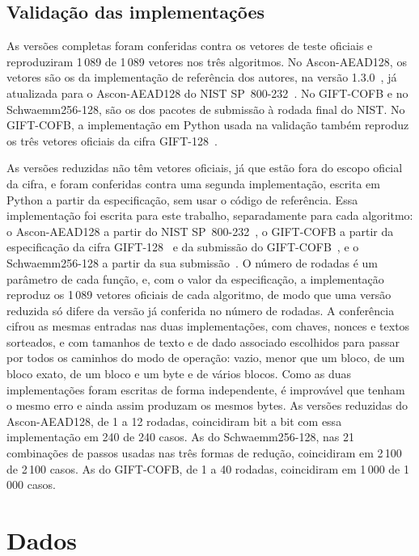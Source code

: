 \subsection{Validação das implementações}
\label{sec:met-validacao}

As versões completas foram conferidas contra os vetores de teste oficiais e reproduziram 1\,089 de 1\,089 vetores nos três algoritmos. No Ascon-AEAD128, os vetores são os da implementação de referência dos autores, na versão 1.3.0~\cite{AsconC2024}, já atualizada para o Ascon-AEAD128 do NIST SP~800-232~\cite{nist_sp800232_2025}. No GIFT-COFB e no Schwaemm256-128, são os dos pacotes de submissão à rodada final do NIST. No GIFT-COFB, a implementação em Python usada na validação também reproduz os três vetores oficiais da cifra GIFT-128~\cite{Banik2017}.

As versões reduzidas não têm vetores oficiais, já que estão fora do escopo oficial da cifra, e foram conferidas contra uma segunda implementação, escrita em Python a partir da especificação, sem usar o código de referência. Essa implementação foi escrita para este trabalho, separadamente para cada algoritmo: o Ascon-AEAD128 a partir do NIST SP~800-232~\cite{nist_sp800232_2025}, o GIFT-COFB a partir da especificação da cifra GIFT-128~\cite{Banik2017} e da submissão do GIFT-COFB~\cite{Banik2021}, e o Schwaemm256-128 a partir da sua submissão~\cite{Beierle2021SparkleSub}. O número de rodadas é um parâmetro de cada função, e, com o valor da especificação, a implementação reproduz os 1\,089 vetores oficiais de cada algoritmo, de modo que uma versão reduzida só difere da versão já conferida no número de rodadas. A conferência cifrou as mesmas entradas nas duas implementações, com chaves, nonces e textos sorteados, e com tamanhos de texto e de dado associado escolhidos para passar por todos os caminhos do modo de operação: vazio, menor que um bloco, de um bloco exato, de um bloco e um byte e de vários blocos. Como as duas implementações foram escritas de forma independente, é improvável que tenham o mesmo erro e ainda assim produzam os mesmos bytes. As versões reduzidas do Ascon-AEAD128, de 1 a 12 rodadas, coincidiram bit a bit com essa implementação em 240 de 240 casos. As do Schwaemm256-128, nas 21 combinações de passos usadas nas três formas de redução, coincidiram em 2\,100 de 2\,100 casos. As do GIFT-COFB, de 1 a 40 rodadas, coincidiram em 1\,000 de 1\,000 casos.

\section{Dados}
\label{sec:met-dados}

